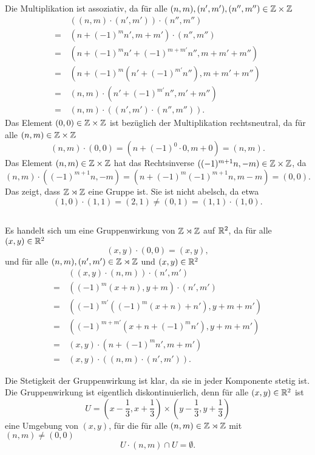 \documentclass[a4paper,10pt]{article}
\begin{document}
\subsection{}
Die Multiplikation ist assoziativ, da für alle $(n, m), (n', m'), (n'', m'') \in \mathbb{Z} \times \mathbb{Z}$
\begin{align*}
  &\, ((n, m) \cdot (n', m')) \cdot (n'', m'') \\
 =&\, \left(n + (-1)^m n', m + m'\right) \cdot (n'', m'') \\
 =&\, \left(n + (-1)^m n' + (-1)^{m+m'} n'', m + m' + m''\right) \\
 =&\, \left(n + (-1)^m \left(n' + (-1)^{m'} n''\right) ,m + m' + m''\right) \\
 =&\, (n, m) \cdot (n' + (-1)^{m'} n'', m' + m'') \\
 =&\, (n, m) \cdot ((n', m') \cdot (n'', m'')).
\end{align*}
Das Element $(0,0) \in \mathbb{Z} \times \mathbb{Z}$ ist bezüglich der Multiplikation rechtsneutral, da für alle $(n,m) \in \mathbb{Z} \times \mathbb{Z}$
\[
 (n,m) \cdot (0,0) = (n + (-1)^0 \cdot 0, m + 0) = (n,m).
\]
Das Element $(n,m) \in \mathbb{Z} \times \mathbb{Z}$ hat das Rechtsinverse $((-1)^{m+1}n,-m) \in \mathbb{Z} \times \mathbb{Z}$, da
\[
 (n,m) \cdot \left((-1)^{m+1} n, -m\right)
 = (n + (-1)^m (-1)^{m+1} n, m - m)
 = (0, 0).
\]
Das zeigt, dass $\mathbb{Z} \rtimes \mathbb{Z}$ eine Gruppe ist. Sie ist nicht abelsch, da etwa
\[
 (1,0) \cdot (1,1) = (2,1) \neq (0,1) = (1,1) \cdot (1,0).
\]


\subsection{}
Es handelt sich um eine Gruppenwirkung von $\mathbb{Z} \rtimes \mathbb{Z}$ auf $\mathbb{R}^2$, da für alle $(x,y) \in \mathbb{R}^2$
\[
 (x,y) \cdot (0,0) = (x,y),
\]
und für alle $(n,m), (n', m') \in \mathbb{Z} \rtimes \mathbb{Z}$ und $(x,y) \in \mathbb{R}^2$
\begin{align*}
  &\, ((x,y) \cdot (n,m)) \cdot (n',m') \\
 =&\, ((-1)^m (x + n), y + m) \cdot (n',m') \\
 =&\, \left( (-1)^{m'}((-1)^m (x + n) + n'), y + m + m' \right) \\
 =&\, \left( (-1)^{m+m'} (x + n + (-1)^m n'), y + m + m' \right) \\
 =&\, (x,y) \cdot (n + (-1)^m n', m + m') \\
 =&\, (x,y) \cdot ((n,m) \cdot (n',m')).
\end{align*}

Die Stetigkeit der Gruppenwirkung ist klar, da sie in jeder Komponente stetig ist. Die Gruppenwirkung ist eigentlich diskontinuierlich, denn für alle $(x,y) \in \mathbb{R}^2$ ist 
\[
 U = \left( x-\frac{1}{3}, x+\frac{1}{3} \right) \times \left( y-\frac{1}{3}, y+\frac{1}{3} \right)
\]
eine Umgebung von $(x,y)$, für die für alle $(n,m) \in \mathbb{Z} \rtimes \mathbb{Z}$ mit $(n,m) \neq (0,0)$
\[
 U \cdot (n,m) \cap U = \emptyset.
\]
\end{document}

